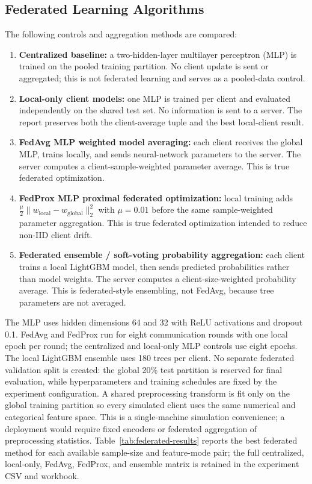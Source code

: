 \documentclass[conference]{IEEEtran}
\begin{document}
\subsection{Federated Learning Algorithms}
The following controls and aggregation methods are compared:
\begin{enumerate}
\item \textbf{Centralized baseline:} a two-hidden-layer multilayer perceptron (MLP) is trained on the pooled training partition. No client update is sent or aggregated; this is not federated learning and serves as a pooled-data control.
\item \textbf{Local-only client models:} one MLP is trained per client and evaluated independently on the shared test set. No information is sent to a server. The report preserves both the client-average tuple and the best local-client result.
\item \textbf{FedAvg MLP weighted model averaging:} each client receives the global MLP, trains locally, and sends neural-network parameters to the server. The server computes a client-sample-weighted parameter average. This is true federated optimization.
\item \textbf{FedProx MLP proximal federated optimization:} local training adds $\frac{\mu}{2}\lVert w_{\mathrm{local}}-w_{\mathrm{global}}\rVert_2^2$ with $\mu=0.01$ before the same sample-weighted parameter aggregation. This is true federated optimization intended to reduce non-IID client drift.
\item \textbf{Federated ensemble / soft-voting probability aggregation:} each client trains a local LightGBM model, then sends predicted probabilities rather than model weights. The server computes a client-size-weighted probability average. This is federated-style ensembling, not FedAvg, because tree parameters are not averaged.
\end{enumerate}

The MLP uses hidden dimensions 64 and 32 with ReLU activations and dropout 0.1. FedAvg and FedProx run for eight communication rounds with one local epoch per round; the centralized and local-only MLP controls use eight epochs. The local LightGBM ensemble uses 180 trees per client. No separate federated validation split is created: the global 20\% test partition is reserved for final evaluation, while hyperparameters and training schedules are fixed by the experiment configuration. A shared preprocessing transform is fit only on the global training partition so every simulated client uses the same numerical and categorical feature space. This is a single-machine simulation convenience; a deployment would require fixed encoders or federated aggregation of preprocessing statistics. Table~\ref{tab:federated-results} reports the best federated method for each available sample-size and feature-mode pair; the full centralized, local-only, FedAvg, FedProx, and ensemble matrix is retained in the experiment CSV and workbook.
\end{document}

